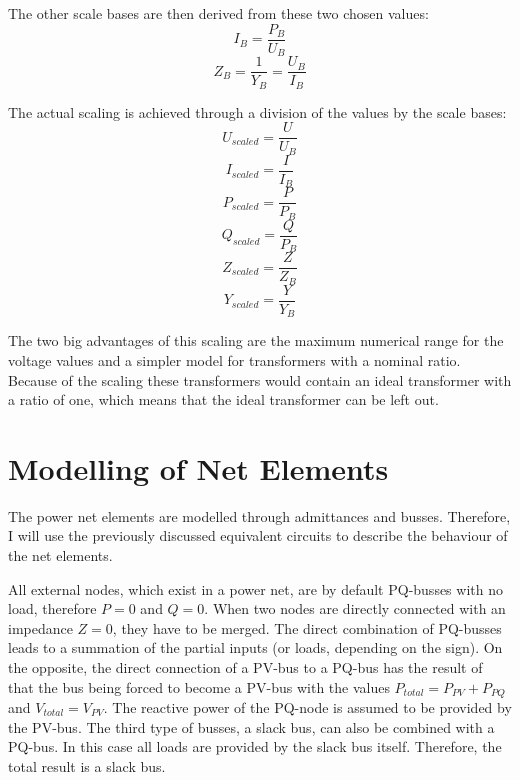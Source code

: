 The other scale bases are then derived from these two chosen values:
\begin{equation}
	I_B = \frac{P_B}{U_B}
\end{equation}
\begin{equation}
	Z_B = \frac{1}{Y_B} = \frac{U_B}{I_B}
\end{equation}

The actual scaling is achieved through a division of the values by the scale bases:
\begin{equation}
	U_{scaled} = \frac{U}{U_B}
\end{equation}
\begin{equation}
	I_{scaled} = \frac{I}{I_B}
\end{equation}
\begin{equation}
	P_{scaled} = \frac{P}{P_B}
\end{equation}
\begin{equation}
	Q_{scaled} = \frac{Q}{P_B}
\end{equation}
\begin{equation}
	Z_{scaled} = \frac{Z}{Z_B}
\end{equation}
\begin{equation}
	Y_{scaled} = \frac{Y}{Y_B}
	\label{eq:scaling_admittance}
\end{equation}

The two big advantages of this scaling are the maximum numerical range for the voltage values and a simpler model for transformers with a nominal ratio. Because of the scaling these transformers would contain an ideal transformer with a ratio of one, which means that the ideal transformer can be left out.

\section{Modelling of Net Elements}
\label{sec:modelling}

The power net elements are modelled through admittances and busses. Therefore, I will use the previously discussed equivalent circuits to describe the behaviour of the net elements.

All external nodes, which exist in a power net, are by default PQ-busses with no load, therefore $P = 0$ and $Q = 0$. When two nodes are directly connected with an impedance $Z = 0$, they have to be merged. The direct combination of PQ-busses leads to a summation of the partial inputs (or loads, depending on the sign). On the opposite, the direct connection of a PV-bus to a PQ-bus has the result of that the bus being forced to become a PV-bus with the values $P_{total} = P_{PV} + P_{PQ}$ and $V_{total} = V_{PV}$. The reactive power of the PQ-node is assumed to be provided by the PV-bus. The third type of busses, a slack bus, can also be combined with a PQ-bus. In this case all loads are provided by the slack bus itself. Therefore, the total result is a slack bus.

